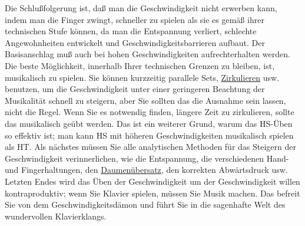Die Schlußfolgerung ist, daß man die Geschwindigkeit nicht erwerben kann, indem man die Finger zwingt, schneller zu spielen als sie es gemäß ihrer technischen Stufe können, da man die Entspannung verliert, schlechte Angewohnheiten entwickelt und Geschwindigkeitsbarrieren aufbaut.
Der Basisanschlag muß auch bei hohen Geschwindigkeiten aufrechterhalten werden.
Die beste Möglichkeit, innerhalb Ihrer technischen Grenzen zu bleiben, ist, musikalisch zu spielen.
Sie können kurzzeitig parallele Sets, \hyperref[c1iii2]{Zirkulieren} usw. benutzen, um die Geschwindigkeit unter einer geringeren Beachtung der Musikalität schnell zu steigern, aber Sie sollten das die Ausnahme sein lassen, nicht die Regel.
Wenn Sie es notwendig finden, längere Zeit zu zirkulieren, sollte das musikalisch geübt werden.
Das ist ein weiterer Grund, warum das HS-Üben so effektiv ist; man kann HS mit höheren Geschwindigkeiten musikalisch spielen als HT.
Als nächstes müssen Sie alle analytischen Methoden für das Steigern der Geschwindigkeit verinnerlichen, wie die Entspannung, die verschiedenen Hand- und Fingerhaltungen, den \hyperref[c1iii5b]{Daumenübersatz}, den korrekten Abwärtsdruck usw.
Letzten Endes wird das Üben der Geschwindigkeit um der Geschwindigkeit willen kontraproduktiv; wenn Sie Klavier spielen, müssen Sie Musik machen.
Das befreit Sie von dem Geschwindigkeitsdämon und führt Sie in die sagenhafte Welt des wundervollen Klavierklangs.



